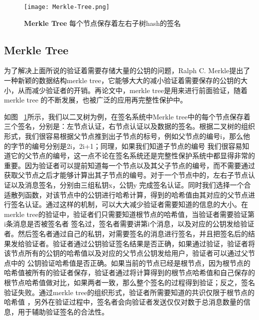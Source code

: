 \begin{figure}[!htp]
    \centering
    \texttt{[image: Merkle-Tree.png]}
    \caption{\textbf{Merkle Tree }每个节点保存着左右子树hash的签名}
   \label{fig:Merkle-Tree.png}
\end{figure}
\subsection{Merkle Tree}
为了解决上面所说的验证着需要存储大量的公钥的问题，Ralph C. Merkle提出了一种新颖的数据结构merkle tree，它能够大大的减小验证着需要保存的公钥的大小，从而减少验证者的开销。再论文中，merkle tree是用来进行前面验证，随着merkle tree
的不断发展，也被广泛的应用再完整性保护中。

如图 ~\ref{fig:Merkle-Tree.png}所示，我们以二叉树为例，在签名系统中Merkle tree中的每个节点保存着三个签名，分别是：左节点认证，右节点认证以及数据的签名。根据二叉树的组织形式，我们很容易根据父节点推到出子节点的标号，例如父节点的编号i，那么他的字节的编号分别是2i，2i+1；同理，如果我们知道子节点的编号
我们很容易知道它的父节点的编号，这一点不论在签名系统还是完整性保护系统中都显得非常的重要。因为验证者可以提前知道每一个节点以及其父子节点的编号，而不需要通过获取父节点之后才能够计算出其子节点的编号。对于一个节点中的，左右子节点认证以及消息签名，分别由三组私钥x，公钥y
完成签名认证。同时我们选择一个合适散列函数，对该节点中的公钥进行哈希计算，得到的哈希值由其对应的父节点进行签名认证。通过这样的机制，可以大大减少验证者需要知道的信息的大小。在merkle tree的验证中，验证者们只需要知道根节点的哈希值，当验证者需要验证第i条消息是否被签名者
签名过，签名者需要讲第i个消息，以及对应的公钥发给验证者。然后签名者通过自己的私钥，对需要签名的消息进行签名，并且把签名后的结果发给验证者。验证者通过公钥验证签名结果是否正确，如果通过验证，验证者将该节点所有的公钥的哈希值以及对应的父节点公钥发给用户，验证者可以通过父节点中的
公钥验证哈希值是否正确。如果当前的节点已经是根节点，因为根节点的哈希值被所有的验证者保存，验证者通过将计算得到的根节点哈希值和自己保存的根节点哈希值做对比，如果两者一致，那么整个签名的过程得到验证；反之，签名验证失败。通过merkle tree的组织形式，验证者所需要知道的共识仅限于根节点的哈希值
，另外在验证过程中，签名者会向验证者发送仅仅对数于总消息数量的信息，用于辅助验证签名的合法性。

